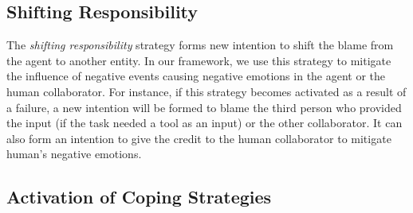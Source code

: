 \documentclass[12pt]{report}
\begin{document}
\subsection{Shifting Responsibility}
The \textit{shifting responsibility} strategy forms new intention to shift the
blame from the agent to another entity. In our framework, we use this strategy
to mitigate the influence of negative events causing negative emotions in the
agent or the human collaborator. For instance, if this strategy becomes
activated as a result of a failure, a new intention will be formed to blame the
third person who provided the input (if the task needed a tool as an input) or
the other collaborator. It can also form an intention to give the credit to the
human collaborator to mitigate human's negative emotions.

\subsection{Activation of Coping Strategies}
\end{document}

